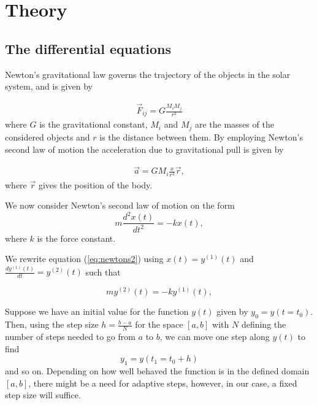 \documentclass[../main.tex]{subfiles}
\begin{document}
\section{Theory}\label{sec:theory}

\subsection{The differential equations}
Newton's gravitational law governs the trajectory of the objects in the solar system, and is given by  

\begin{align}
    \vec{F}_{ij}=G\frac{M_iM_j}{r^2}
    \label{eq:newton-grav}
\end{align} where $G$ is the gravitational constant, $M_i$ and $M_j$ are the masses of the considered objects and $r$ is the distance between them. By employing Newton's second law of motion the acceleration due to gravitational pull is given by
 
\begin{align}
    \vec{a} = GM_i\frac{x}{r^3}\vec{r}, 
    \label{eq:a-grav}
\end{align} where $\vec{r}$ gives the position of the body. 

We now consider Newton's second law of motion on the form 
\begin{equation}\label{eq:newtons2}
    m\frac{d^2 x(t)}{dt^2} = -kx(t),
\end{equation} where $k$ is the force constant.

We rewrite equation (\ref{eq:newtons2}) using $x(t) = y^{(1)}(t)$ and $\frac{d y^{(1)}(t)}{dt} =  y^{(2)}(t)$ such that %

\begin{equation}
    my^{(2)}(t) = -ky^{(1)}(t),
\end{equation}

Suppose we have an initial value for the function $y(t)$ given by $y_0 = y(t=t_0)$. Then, using the step size $h = \frac{b - a}{N}$ for the space $[a,b]$ with $N$ defining the number of steps needed to go from $a$ to $b$, we can move one step along $y(t)$ to find 
\begin{equation}\label{eq:y_1}
    y_1 = y(t_1 = t_0 + h)
\end{equation}
and so on. Depending on how well behaved the function is in the defined domain $[a, b]$, there might be a need for adaptive steps, however, in our case, a fixed step size will suffice. 
\end{document}
